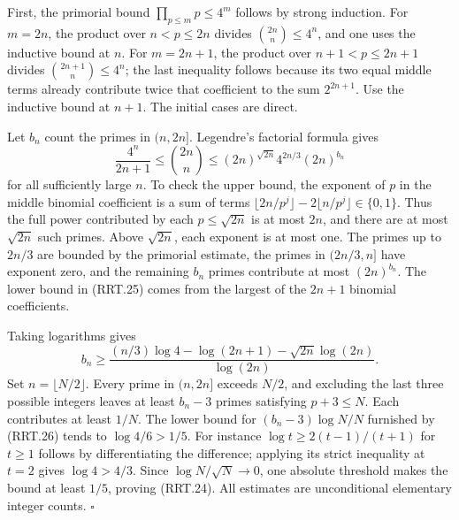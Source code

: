 First, the primorial bound $\prod_{p\le m}p\le4^m$ follows by
strong induction.  For $m=2n$, the product over $n<p\le2n$
divides $\binom{2n}{n}\le4^n$, and one uses the inductive bound
at $n$.  For $m=2n+1$, the product over
$n+1<p\le2n+1$ divides $\binom{2n+1}{n}\le4^n$; the last
inequality follows because its two equal middle terms already
contribute twice that coefficient to the sum $2^{2n+1}$.
Use the inductive bound at $n+1$.  The initial cases are direct.

Let $b_n$ count the primes in $(n,2n]$.  Legendre's factorial
formula gives
\[
 \frac{4^n}{2n+1}\le\binom{2n}{n}
                 \le (2n)^{\sqrt{2n}}4^{2n/3}(2n)^{b_n}
 \tag{RRT.25}
\]
for all sufficiently large $n$.  To check the upper bound,
the exponent of $p$ in the middle binomial coefficient is a sum
of terms
$\lfloor2n/p^j\rfloor-2\lfloor n/p^j\rfloor\in\{0,1\}$.
Thus the full power contributed by each $p\le\sqrt{2n}$ is at
most $2n$, and there are at most $\sqrt{2n}$ such primes.
Above $\sqrt{2n}$, each exponent is at most one.  The primes up
to $2n/3$ are bounded by the primorial estimate, the primes in
$(2n/3,n]$ have exponent zero, and the remaining $b_n$ primes
contribute at most $(2n)^{b_n}$.  The lower bound in (RRT.25)
comes from the largest of the $2n+1$ binomial coefficients.

Taking logarithms gives
\[
 b_n\ge\frac{(n/3)\log4-\log(2n+1)
                           -\sqrt{2n}\log(2n)}{\log(2n)}.
 \tag{RRT.26}
\]
Set $n=\lfloor N/2\rfloor$.  Every prime in $(n,2n]$ exceeds
$N/2$, and excluding the last three possible integers leaves
at least $b_n-3$ primes satisfying $p+3\le N$.
Each contributes at least $1/N$.  The lower bound for
$(b_n-3)\log N/N$ furnished by (RRT.26) tends to
$\log4/6>1/5$.  For instance
$\log t\ge2(t-1)/(t+1)$ for $t\ge1$ follows by differentiating
the difference; applying its strict inequality at $t=2$ gives
$\log4>4/3$.  Since $\log N/\sqrt N\to0$, one absolute
threshold makes the bound at least $1/5$, proving (RRT.24).
All estimates are unconditional elementary integer counts.
\hfill$\square$

